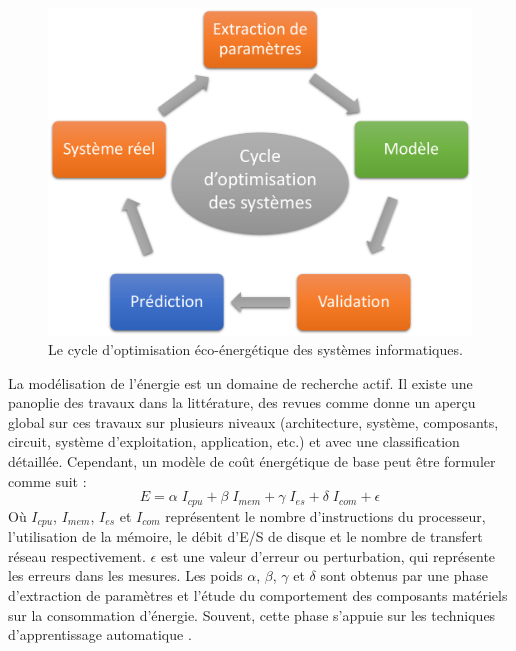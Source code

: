 \begin{figure}
 \centering
 \includegraphics[scale=0.5]{chapitre3/chap3Fig/model-building.pdf}
 \caption{Le cycle d'optimisation éco-énergétique des systèmes informatiques.}
 \label{fig:model-building}
\end{figure}

La modélisation de l'énergie est un domaine de recherche actif. Il existe une panoplie des travaux dans la littérature, des revues comme \cite{Beloglazov11,Reda12,Ge13,Orgerie14,Dayarathna16} donne un aperçu global sur ces travaux sur plusieurs niveaux (architecture, système, composants, circuit, système d'exploitation, application, etc.) et avec une classification détaillée. Cependant, un modèle de coût énergétique de base peut être formuler comme suit :
\begin{equation}
 E = \alpha \; I_{cpu} + \beta \; I_{mem} + \gamma \; I_{es} + \delta \; I_{com} + \epsilon 
\end{equation} 
Où $I_{cpu}$, $I_{mem}$, $I_{es}$ et $I_{com}$ représentent le nombre d'instructions du processeur, l'utilisation de la mémoire, le débit d'E/S de disque et le nombre de transfert réseau respectivement. $\epsilon$ est une valeur d'erreur ou perturbation, qui représente les erreurs dans les mesures. Les poids $\alpha$, $\beta$, $\gamma$ et $\delta$ sont obtenus par une phase d'extraction de paramètres et l'étude du comportement des composants matériels sur la consommation d'énergie. Souvent, cette phase s'appuie sur les techniques d'apprentissage automatique \cite{Michalski13}.

